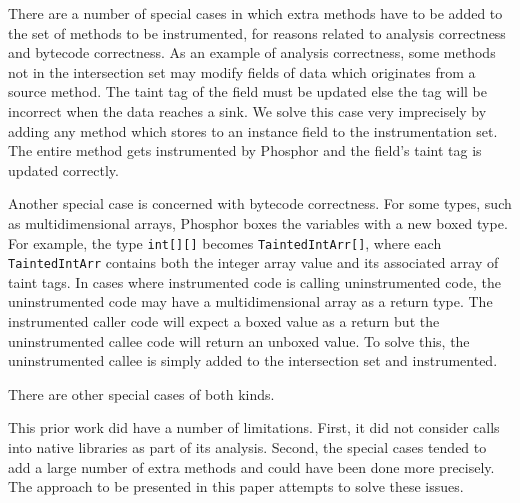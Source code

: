 There are a number of special cases in which extra methods have to be added to the set of methods to be instrumented, for reasons related to analysis correctness and bytecode correctness. As an example of analysis correctness, some methods not in the intersection set may modify fields of data which originates from a source method. The taint tag of the field must be updated else the tag will be incorrect when the data reaches a sink. We solve this case very imprecisely by adding any method which stores to an instance field to the instrumentation set. The entire method gets instrumented by Phosphor and the field's taint tag is updated correctly.

Another special case is concerned with bytecode correctness. For some types, such as multidimensional arrays, Phosphor boxes the variables with a new boxed type. For example, the type \texttt{int[][]} becomes \texttt{TaintedIntArr[]}, where each \texttt{TaintedIntArr} contains both the integer array value and its associated array of taint tags. In cases where instrumented code is calling uninstrumented code, the uninstrumented code may have a multidimensional array as a return type. The instrumented caller code will expect a boxed value as a return but the uninstrumented callee code will return an unboxed value. To solve this, the uninstrumented callee is simply added to the intersection set and instrumented.

There are other special cases of both kinds.

This prior work did have a number of limitations. First, it did not consider calls into native libraries as part of its analysis. Second, the special cases tended to add a large number of extra methods and could have been done more precisely. The approach to be presented in this paper attempts to solve these issues.

